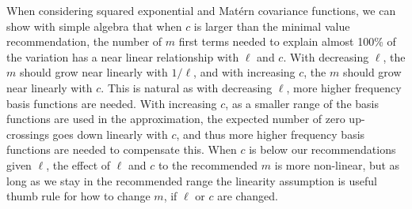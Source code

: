 When considering squared exponential and Mat{\'e}rn covariance functions, we can show with simple algebra that when $c$ is larger than the minimal value recommendation, the number of $m$ first terms needed to explain almost 100\% of the variation has a near linear relationship with $\ell$ and $c$. With decreasing $\ell$, the $m$ should grow near linearly with $1/\ell$, and with increasing $c$, the $m$ should grow near linearly with $c$.
%
This is natural as with decreasing $\ell$, more higher frequency basis functions are needed. With increasing $c$, as a smaller range of the basis functions are used in the approximation, the expected number of zero up-crossings goes down linearly with $c$, and thus more higher frequency basis functions are needed to compensate this.
%
When $c$ is below our recommendations given $\ell$, the effect of $\ell$ and $c$ to the recommended $m$ is more non-linear, but as long as we stay in the recommended range the linearity assumption is useful thumb rule for how to change $m$, if $\ell$ or $c$ are changed.



